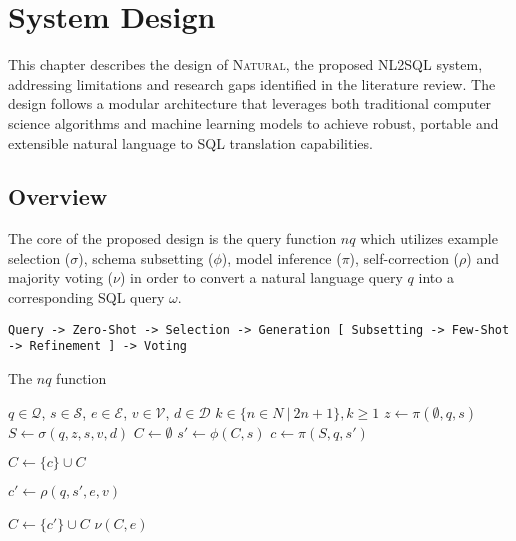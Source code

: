 \section{System Design}

This chapter describes the design of \textsc{Natural}, the proposed NL2SQL system, 
addressing limitations and research gaps identified in the literature review.
The design follows a modular architecture that leverages both traditional computer
science algorithms and machine learning models to achieve robust, portable and
extensible natural language to SQL translation capabilities.

\subsection{Overview}

The core of the proposed design is the query function $nq$ which utilizes
example selection ($\sigma$), schema subsetting ($\phi$), model inference ($\pi$),
self-correction ($\rho$) and majority voting ($\nu$) in order to convert a natural
language query $q$ into a corresponding SQL query $\omega$.

\begin{verbatim}
Query -> Zero-Shot -> Selection -> Generation [ Subsetting -> Few-Shot -> Refinement ] -> Voting
\end{verbatim}

\begin{algorithm}

\caption{The $nq$ function}\label{algorithms:nq}

\begin{algorithmic}[1]
\Require $q \in \mathcal{Q}$, $s \in \mathcal{S}$, $e \in \mathcal{E}$, $v \in \mathcal{V}$, $d \in \mathcal{D}$
\Require $k \in \{ n \in N\ |\ 2n + 1 \}, k \geq 1$
\State $z \gets \pi(\emptyset,q, s)$       
\State $S \gets \sigma(q,z,s,v,d)$         
\State $C \gets \emptyset$                 
                          
    \State $s' \gets \phi(C, s)$           
    \State $c \gets \pi(S, q, s')$         

                               
        \State $C \gets \{c\} \cup C$      
    \EndIf

    \State $c' \gets \rho(q, s', e, v)$  

                              
        \State $C \gets \{c'\} \cup C$    
    \EndIf
\EndWhile
\State \Return $\nu(C, e)$               
\end{algorithmic}

\end{algorithm}

